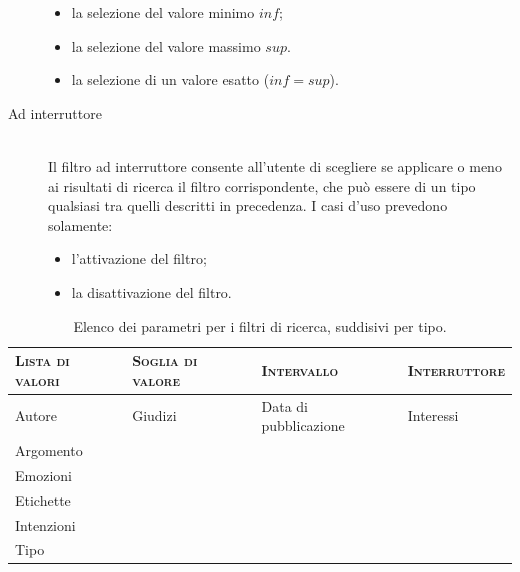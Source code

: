 \begin{description}
\begin{itemize}
		\item la selezione del valore minimo $inf$;
		\item la selezione del valore massimo $sup$.
		\item la selezione di un valore esatto ($inf = sup$).
	\end{itemize}
	\item[Ad interruttore] \hfill \\
	Il filtro ad interruttore consente all'utente di scegliere se applicare o meno ai risultati di ricerca il filtro corrispondente, che può essere di un tipo qualsiasi tra quelli descritti in precedenza. I casi d'uso prevedono solamente:
	\begin{itemize}
		\item l'attivazione del filtro;
		\item la disattivazione del filtro.
	\end{itemize}
\end{description}

\begin{table}[ht]
\centering
\begin{tabular}{|l|l|l|l|}
\hline
\textsc{Lista di valori} & \textsc{Soglia di valore} & \textsc{Intervallo} & \textsc{Interruttore}\\ \hline
Autore & Giudizi & Data di pubblicazione & Interessi \\
Argomento & & & \\
Emozioni & & & \\
Etichette & & & \\
Intenzioni & & & \\
Tipo & & & \\ \hline
\end{tabular}
\caption{Elenco dei parametri per i filtri di ricerca, suddisivi per tipo.}
\label{tab:tesi:stage:parametri-filtri-tipo}
\end{table}

